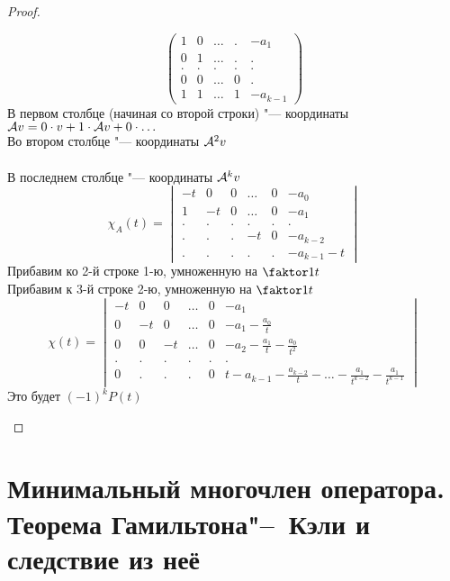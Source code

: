 \begin{proof}
\begin{itemize}
$$\begin{pmatrix}
            1 & 0 & \dots & . & -a_1 \\
            0 & 1 & \dots & . & . \\
            . & . & . & . & . \\
            0 & 0 & \dots & 0 & . \\
            1 & 1 & \dots & 1 & -a_{k - 1}
        \end{pmatrix} $$
        В первом столбце (начиная со второй строки) "--- координаты $ \mathcal{A}v = 0 \cdot v + 1 \cdot \mathcal{A}v + 0 \cdot \dots $ \\
        Во втором столбце "--- координаты $ \mathcal{A}^2v $ \\
        \widedots[10em] \\
        В последнем столбце "--- координаты $ \mathcal{A}^kv $
        $$ \chi_A(t) =
        \begin{vmatrix}
            -t & 0 & 0 & \dots & 0 & -a_0 \\
            1 & -t & 0 & \dots & 0 & -a_1 \\
            . & . & . & . & . & . \\
            . & . & . & -t & 0 & -a_{k - 2} \\
            . & . & . & . & . & -a_{k - 1} - t
        \end{vmatrix} $$
        Прибавим ко 2-й строке 1-ю, умноженную на $ \faktor1t $ \\
        Прибавим к 3-й строке 2-ю, умноженную на $ \faktor1t $
        \widedots[10em]
        $$ \chi(t) =
        \begin{vmatrix}
            -t & 0 & 0 & \dots & 0 & -a_1 \\
            0 & -t & 0 & \dots & 0 & -a_1 - \frac{a_0}t \\
            0 & 0 & -t & \dots & 0 & -a_2 - \frac{a_1}t - \frac{a_0}{t^2} \\
            . & . & . & . & . & . \\
            0 & . & . & . & 0 & t - a_{k - 1} - \frac{a_{k -2}}t - \dots - \frac{a_1}{t^{k - 2}} - \frac{a_1}{t^{k - 1}}
        \end{vmatrix} $$
        Это будет $ (-1)^kP(t) $
    \end{itemize}
\end{proof}

\section{Минимальный многочлен оператора. Теорема Гамильтона\texorpdfstring{"--~}{--}Кэли и следствие из неё}

